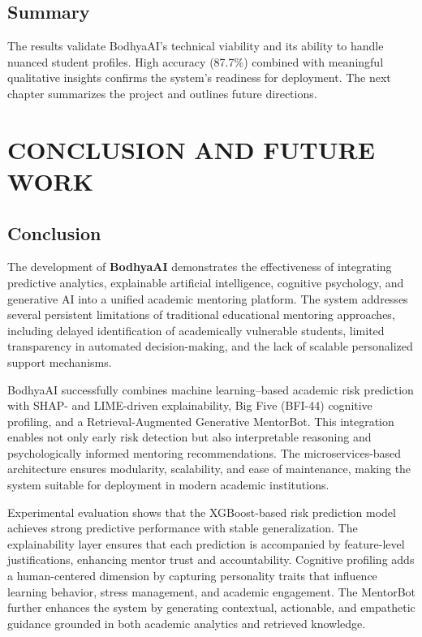 \documentclass[12pt,a4paper]{report}
\begin{document}
\section{Summary}

The results validate BodhyaAI's technical viability and its ability to handle nuanced student profiles. High accuracy (87.7\%) combined with meaningful qualitative insights confirms the system's readiness for deployment. The next chapter summarizes the project and outlines future directions.

\chapter{CONCLUSION AND FUTURE WORK}

\section{Conclusion}

The development of \textbf{BodhyaAI} demonstrates the effectiveness of integrating
predictive analytics, explainable artificial intelligence, cognitive psychology, and
generative AI into a unified academic mentoring platform. The system addresses several
persistent limitations of traditional educational mentoring approaches, including delayed
identification of academically vulnerable students, limited transparency in automated
decision-making, and the lack of scalable personalized support mechanisms.

BodhyaAI successfully combines machine learning–based academic risk prediction with
SHAP- and LIME-driven explainability, Big Five (BFI-44) cognitive profiling, and a
Retrieval-Augmented Generative MentorBot. This integration enables not only early risk
detection but also interpretable reasoning and psychologically informed mentoring
recommendations. The microservices-based architecture ensures modularity, scalability,
and ease of maintenance, making the system suitable for deployment in modern academic
institutions.

Experimental evaluation shows that the XGBoost-based risk prediction model achieves
strong predictive performance with stable generalization. The explainability layer ensures
that each prediction is accompanied by feature-level justifications, enhancing mentor trust
and accountability. Cognitive profiling adds a human-centered dimension by capturing
personality traits that influence learning behavior, stress management, and academic
engagement. The MentorBot further enhances the system by generating contextual,
actionable, and empathetic guidance grounded in both academic analytics and retrieved
knowledge.
\end{document}
